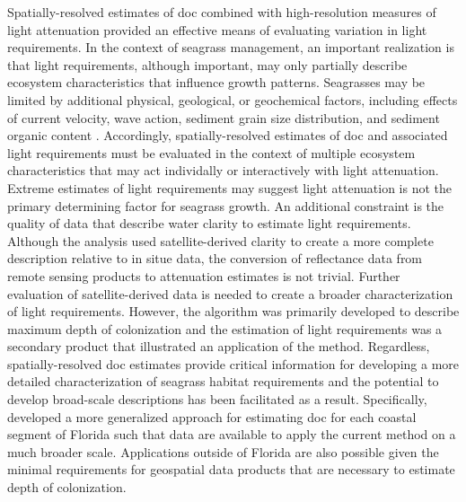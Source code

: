 \documentclass[letterpaper,12pt,oneside]{article}\usepackage[]{graphicx}\usepackage[]{color}
\begin{document}
Spatially-resolved estimates of \ac{doc} combined with high-resolution measures of light attenuation provided an effective means of evaluating variation in light requirements.  In the context of seagrass management, an important realization is that light requirements, although important, may only partially describe ecosystem characteristics that influence growth patterns.  Seagrasses may be limited by additional physical, geological, or geochemical factors, including effects of current velocity, wave action, sediment grain size distribution, and sediment organic content \citep{Koch01}.  Accordingly, spatially-resolved estimates of \ac{doc} and associated light requirements must be evaluated in the context of multiple ecosystem characteristics that may act individally or interactively with light attenuation.  Extreme estimates of light requirements may suggest light attenuation is not the primary determining factor for seagrass growth.  An additional constraint is the quality of data that describe water clarity to estimate light requirements.  Although the analysis used satellite-derived clarity to create a more complete description relative to in situe data, the conversion of reflectance data from remote sensing products to attenuation estimates is not trivial.  Further evaluation of satellite-derived data is needed to create a broader characterization of light requirements.  However, the algorithm was primarily developed to describe maximum depth of colonization and the estimation of light requirements was a secondary product that illustrated an application of the method.  Regardless, spatially-resolved \ac{doc} estimates provide critical information for developing a more detailed characterization of seagrass habitat requirements and the potential to develop broad-scale descriptions has been facilitated as a result.  Specifically,  developed a more generalized approach for estimating \ac{doc} for each coastal segment of Florida such that data are available to apply the current method on a much broader scale.  Applications outside of Florida are also possible given the minimal requirements for geospatial data products that are necessary to estimate depth of colonization.  

\clearpage
\begin{singlespace}


\end{singlespace}
\clearpage

\end{document}
